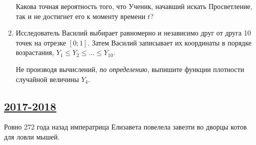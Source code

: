 \begin{enumerate}
Какова точная вероятность того, что Ученик, начавший искать Просветление, так
и не достигнет его к моменту времени $t$?

\item Исследователь Василий выбирает равномерно и независимо друг от друга 10 точек на
отрезке $[0;1]$. Затем Василий записывает их координаты в порядке возрастания,
$Y_1 \leq Y_2 \leq \ldots \leq Y_{10}$.

Не производя вычислений, \textit{по определению},
выпишите функции плотности случайной величины $Y_4$.
\end{enumerate}


\newpage

\subsection[2017-2018]{\hyperref[sec:sol_kr_01_ip_2017_2018]{2017-2018}}
\label{sec:kr_01_ip_2017_2018}

Ровно 272 года назад императрица Елизавета повелела завезти во дворцы котов для ловли мышей.

